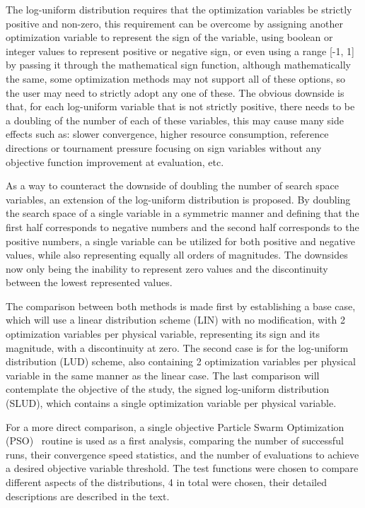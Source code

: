 \documentclass[10pt,fleqn,a4paper,twoside]{article}
\begin{document}
The log-uniform distribution requires that the optimization variables be strictly positive and non-zero, this requirement can be overcome by assigning another optimization variable
to represent the sign of the variable, using boolean or integer values to represent positive or negative sign, or even using a range [-1, 1] by passing it through the mathematical sign function, 
although mathematically the same, some optimization methods may not support all of these options, so the user may need to strictly adopt any one of these. The obvious downside is that, for each
log-uniform variable that is not strictly positive, there needs to be a doubling of the number of each of these variables, this may cause many side effects such as: slower convergence, higher 
resource consumption, reference directions or tournament pressure focusing on sign variables without any objective function improvement at evaluation, etc.

As a way to counteract the downside of doubling the number of search space variables, an extension of the log-uniform distribution is proposed. By doubling the search space of a single variable in 
a symmetric manner and defining that the first half corresponds to negative numbers and the second half corresponds to the positive numbers, a single variable can be utilized for both positive and
negative values, while also representing equally all orders of magnitudes. The downsides now only being the inability to represent zero values and the discontinuity between the lowest
represented values. 

The comparison between both methods is made first by establishing a base case, which will use a linear distribution scheme (LIN) with no modification, with 2 optimization variables per physical variable, representing 
its sign and its magnitude, with a discontinuity at zero. The second case is for the log-uniform distribution (LUD) scheme, also containing 2 optimization variables per physical variable in the same manner as the 
linear case. The last comparison will contemplate the objective of the study, the signed log-uniform distribution (SLUD), which contains a single optimization variable per physical variable. 

For a more direct comparison, a single objective Particle Swarm Optimization (PSO)~\citep{Kennedy1995} routine is used as a first analysis, comparing the number of successful runs, their convergence speed statistics, and the number 
of evaluations to achieve a desired objective variable threshold. The test functions were chosen to compare different aspects of the distributions, 4 in total were chosen, their detailed descriptions 
are described in the text.
\end{document}
